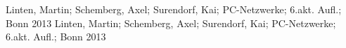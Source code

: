 
 Linten, Martin; Schemberg, Axel; Surendorf, Kai; PC-Netzwerke; 6.akt. Aufl.; Bonn 2013
 Linten, Martin; Schemberg, Axel; Surendorf, Kai; PC-Netzwerke; 6.akt. Aufl.; Bonn 2013
